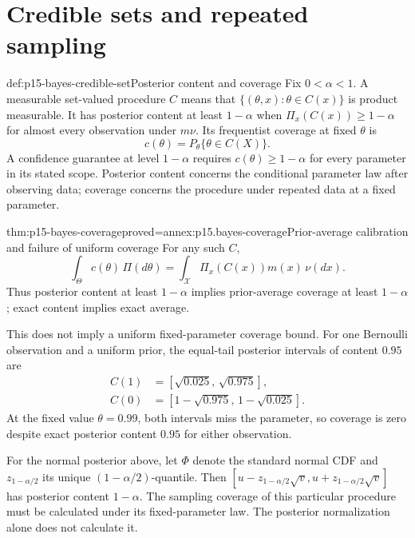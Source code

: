 \section{Credible sets and repeated sampling}
\label{sec:p15-bayes-credible-sets}

\begin{hbdefinition}{def:p15-bayes-credible-set}{Posterior content and coverage}
Fix \(0<\alpha<1\). A measurable set-valued procedure \(C\)
means that \(\{(\theta,x):\theta\in C(x)\}\) is product measurable.
It has posterior content at least \(1-\alpha\) when
\(\Pi_x(C(x))\geq1-\alpha\) for almost every observation under \(m\nu\).
Its frequentist coverage at fixed \(\theta\) is
\[
                     c(\theta)=P_\theta\{\theta\in C(X)\}.
\]
A confidence guarantee at level \(1-\alpha\) requires
\(c(\theta)\geq1-\alpha\) for every parameter in its stated scope.
Posterior content concerns the conditional parameter law after
observing data; coverage concerns the procedure under repeated data
at a fixed parameter.
\end{hbdefinition}

\begin{hbtheorem}{thm:p15-bayes-coverage}{proved=annex:p15.bayes-coverage}{Prior-average calibration and failure of uniform coverage}
For any such \(C\),
\[
 \int_\Theta c(\theta)\,\Pi(d\theta)
   =\int_{\mathcal X}\Pi_x(C(x))m(x)\,\nu(dx).
\]
Thus posterior content at least \(1-\alpha\) implies prior-average
coverage at least \(1-\alpha\); exact content implies exact average.

This does not imply a uniform fixed-parameter coverage bound.
For one Bernoulli observation and a uniform prior, the equal-tail
posterior intervals of content \(0.95\) are
\[
 \begin{split}
 C(1)&=[\sqrt{0.025},\,\sqrt{0.975}],\\
 C(0)&=[1-\sqrt{0.975},\,1-\sqrt{0.025}].
 \end{split}
\]
At the fixed value \(\theta=0.99\), both intervals miss the parameter,
so coverage is zero despite exact posterior content \(0.95\)
for either observation.
\end{hbtheorem}

For the normal posterior above, let \(\Phi\) denote the standard
normal CDF and \(z_{1-\alpha/2}\) its unique
\((1-\alpha/2)\)-quantile. Then
\([u-z_{1-\alpha/2}\sqrt v,u+z_{1-\alpha/2}\sqrt v]\)
has posterior content \(1-\alpha\). The sampling coverage of this
particular procedure must be calculated under its fixed-parameter law.
The posterior normalization alone does not calculate it.


